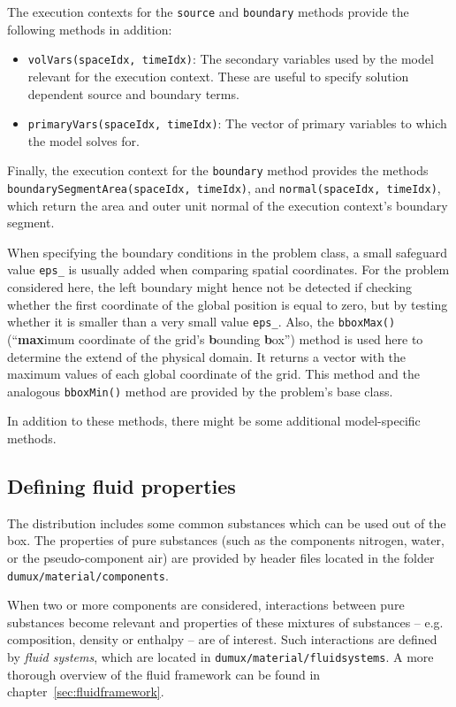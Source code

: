 The execution contexts for the \texttt{source} and \texttt{boundary}
methods provide the following methods in addition:
\begin{itemize}
\item \texttt{volVars(spaceIdx, timeIdx)}: The secondary variables
  used by the model relevant for the execution context. These are
  useful to specify solution dependent source and boundary terms.
\item \texttt{primaryVars(spaceIdx, timeIdx)}: The vector of primary
  variables to which the model solves for.
\end{itemize}

Finally, the execution context for the \texttt{boundary} method
provides the methods \texttt{boundarySegmentArea(spaceIdx, timeIdx)},
and \texttt{normal(spaceIdx, timeIdx)}, which return the area and
outer unit normal of the execution context's boundary segment.

When specifying the boundary conditions in the problem class, a small
safeguard value \texttt{eps\_} is usually added when comparing spatial
coordinates. For the problem considered here, the left boundary might
hence not be detected if checking whether the first coordinate of the
global position is equal to zero, but by testing whether it is smaller
than a very small value \texttt{eps\_}. Also, the \texttt{bboxMax()}
(``\textbf{max}imum coordinate of the grid's \textbf{b}ounding
\textbf{b}ox'') method is used here to determine the extend of the
physical domain. It returns a vector with the maximum values of each
global coordinate of the grid. This method and the analogous
\texttt{bboxMin()} method are provided by the problem's base class.

In addition to these methods, there might be some additional
model-specific methods. 

\subsection{Defining fluid properties}
\label{tutorial-coupled:description-fluid-class}

The \eWoms distribution includes some common substances which can be
used out of the box. The properties of pure substances (such as
the components nitrogen, water, or the pseudo-component air) are
provided by header files located in the folder
\texttt{dumux/material/components}.

When two or more components are considered, interactions between pure
substances become relevant and properties of these mixtures of
substances -- e.g. composition, density or enthalpy -- are of
interest. Such interactions are defined by {\em fluid systems}, which
are located in \texttt{dumux/material/fluidsystems}. A more thorough
overview of the \eWoms fluid framework can be found in
chapter~\ref{sec:fluidframework}.

